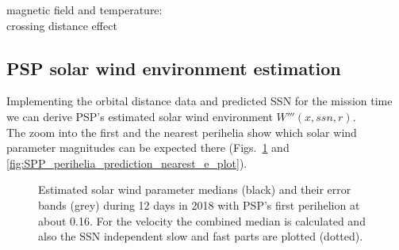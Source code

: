 magnetic field and temperature:\\
crossing distance effect\\


\subsection{PSP solar wind environment estimation}
Implementing the orbital distance data and predicted SSN for the mission time we can derive PSP's estimated solar wind environment $W'''(x,ssn,r)$.\\
The zoom into the first and the nearest perihelia show which solar wind parameter magnitudes can be expected there (Figs.~\ref{fig:SPP_perihelia_prediction_e_plot} and \ref{fig:SPP_perihelia_prediction_nearest_e_plot}).\\
\begin{figure}
	\caption{Estimated solar wind parameter medians (black) and their error bands (grey) during 12 days in 2018 with PSP's first perihelion at about \SI{0.16}{\au}. For the velocity the combined median is calculated and also the SSN independent slow and fast parts are plotted (dotted).}
	\label{fig:SPP_perihelia_prediction_e_plot}
\end{figure}
